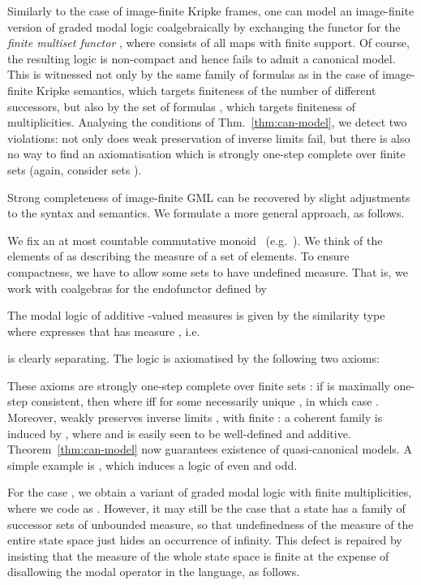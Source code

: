 \documentclass[proceedings]{stacs}
\theoremstyle{definition}
\theoremstyle{plain}
\begin{document}
\begin{exa}
\label{expl:gml-finite}
Similarly to the case of image-finite Kripke frames, one can model an
image-finite version of graded modal logic coalgebraically by
exchanging the functor  for the \emph{finite multiset
  functor} , where  consists of all maps 
with finite support. Of course, the resulting logic is non-compact and
hence fails to admit a canonical model. This is witnessed not only by
the same family of formulas as in the case of image-finite Kripke
semantics, which targets finiteness of the number of different
successors, but also by the set of formulas , which targets finiteness of multiplicities. Analysing the
conditions of Thm.~\ref{thm:can-model}, we detect two violations: not
only does weak preservation of inverse limits fail, but there is also
no way to find an axiomatisation which is strongly one-step complete
over finite sets (again, consider sets ).
\end{exa}

\noindent Strong completeness of image-finite GML can be recovered by
slight adjustments to the syntax and semantics. We formulate a more
general approach, as follows.

\begin{exa}
\label{expl:additive-measures}
We fix an at most countable commutative monoid~ (e.g.\
). We think of the elements of  as describing the measure
of a set of elements. To ensure compactness, we have to allow some
sets to have undefined measure. That is, we work with coalgebras for
the endofunctor  defined by
 
The modal logic of additive -valued measures is given by the
similarity type  where
 expresses that  has measure , i.e.\

 is clearly separating. The logic is axiomatised by the
following two axioms:

These axioms are strongly one-step complete over finite sets : if
 is maximally one-step
consistent, then  where  iff
 for some necessarily unique , in which case
. Moreover,  weakly preserves inverse limits
, with finite : a coherent family
 is induced by
, where  and  is easily seen
to be well-defined and additive. Theorem~\ref{thm:can-model} now
guarantees existence of quasi-canonical models. A simple example is , which induces a logic of even and odd.

For the case , we obtain a variant of graded modal logic
with finite multiplicities, where we code  as . However, it may still be the case that
a state has a family of successor sets of unbounded measure, so that
undefinedness of the measure of the entire state space just hides an
occurrence of infinity. This defect is repaired by insisting that the
measure of the whole state space is finite at the expense of
disallowing the modal operator  in the language, as follows.
\end{exa}
\end{document}
